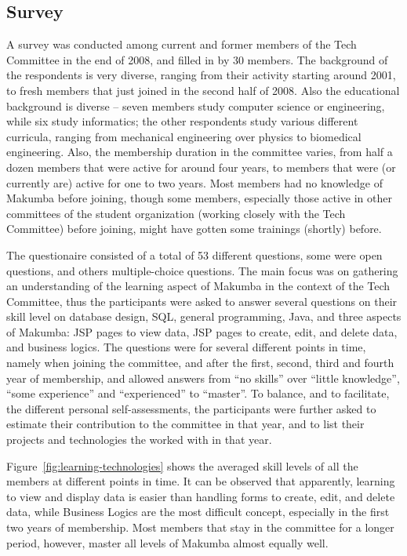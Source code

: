 \documentclass{acm_proc_article-sp}
\begin{document}
\subsection{Survey}\label{sec:techCommittee-survey}
A survey was conducted among current and former members of the Tech Committee in the end of 2008, and filled in by 30 members. The background of the respondents is very diverse, ranging from their activity starting around 2001, to fresh members that just joined in the second half of 2008. Also the educational background is diverse -- seven members study computer science or engineering, while six study informatics; the other respondents study various different curricula, ranging from mechanical engineering over physics to biomedical engineering. Also, the membership duration in the committee varies, from half a dozen members that were active for around four years, to members that were (or currently are) active for one to two years. Most members had no knowledge of Makumba before joining, though some members, especially those active in other committees of the student organization (working closely with the Tech Committee) before joining, might have gotten some trainings (shortly) before.

The questionaire consisted of a total of 53 different questions, some were open questions, and others multiple-choice questions. The main focus was on gathering an understanding of the learning aspect of Makumba in the context of the Tech Committee, thus the participants were asked to answer several questions on their skill level on database design, SQL, general programming, Java, and three aspects of Makumba: JSP pages to view data, JSP pages to create, edit, and delete data, and business logics. The questions were for several different points in time, namely when joining the committee, and after the first, second, third and fourth year of membership, and allowed answers from ``no skills'' over ``little knowledge'', ``some experience'' and ``experienced'' to ``master''. To balance, and to facilitate, the different personal self-assessments, the participants were further asked to estimate their contribution to the committee in that year, and to list their projects and technologies the worked with in that year.

Figure~\ref{fig:learning-technologies} shows the averaged skill levels of all the members at different points in time. It can be observed that apparently, learning to view and display data is easier than handling forms to create, edit, and delete data, while Business Logics are the most difficult concept, especially in the first two years of membership. Most members that stay in the committee for a longer period, however, master all levels of Makumba almost equally well.
\end{document}
